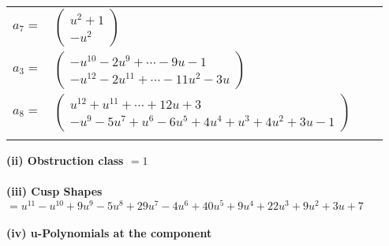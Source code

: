 \documentclass[1p]{elsarticle_modified}
\theoremstyle{definition}
\begin{document}
\begin{tabular}{m{7pt} m{180pt} m{7pt} m{180pt} }
\flushright $a_{7}=$&$\begin{pmatrix}u^2+1\\- u^2\end{pmatrix}$ \\
\flushright $a_{3}=$&$\begin{pmatrix}- u^{10}-2 u^9+\cdots-9 u-1\\- u^{12}-2 u^{11}+\cdots-11 u^2-3 u\end{pmatrix}$ \\
\flushright $a_{8}=$&$\begin{pmatrix}u^{12}+u^{11}+\cdots+12 u+3\\- u^9-5 u^7+u^6-6 u^5+4 u^4+u^3+4 u^2+3 u-1\end{pmatrix}$\\&\end{tabular}
\flushleft \textbf{(ii) Obstruction class $= 1$}\\~\\
\flushleft \textbf{(iii) Cusp Shapes $= u^{11}- u^{10}+9 u^9-5 u^8+29 u^7-4 u^6+40 u^5+9 u^4+22 u^3+9 u^2+3 u+7$}\\~\\
\newpage\renewcommand{\arraystretch}{1}
\flushleft \textbf{(iv) u-Polynomials at the component}\newline \\
\end{document}
